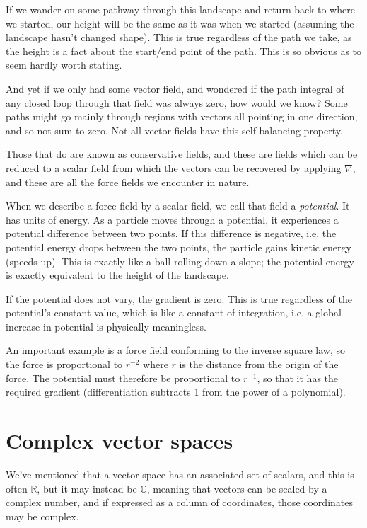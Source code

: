 If we wander on some pathway through this landscape and return back to where we started, our height will be the same as it was when we started (assuming the landscape hasn't changed shape). This is true regardless of the path we take, as the height is a fact about the start/end point of the path. This is so obvious as to seem hardly worth stating.

And yet if we only had some vector field, and wondered if the path integral of any closed loop through that field was always zero, how would we know? Some paths might go mainly through regions with vectors all pointing in one direction, and so not sum to zero. Not all vector fields have this self-balancing property.

Those that do are known as conservative fields, and these are fields which can be reduced to a scalar field from which the vectors can be recovered by applying $\nabla$, and these are all the force fields we encounter in nature.

When we describe a force field by a scalar field, we call that field a \textit{potential}. It has units of energy. As a particle moves through a potential, it experiences a potential difference between two points. If this difference is negative, i.e. the potential energy drops between the two points, the particle gains kinetic energy (speeds up). This is exactly like a ball rolling down a slope; the potential energy is exactly equivalent to the height of the landscape.

If the potential does not vary, the gradient is zero. This is true regardless of the potential's constant value, which is like a constant of integration, i.e. a global increase in potential is physically meaningless.

An important example is a force field conforming to the inverse square law, so the force is proportional to $r^{-2}$ where $r$ is the distance from the origin of the force. The potential must therefore be proportional to $r^{-1}$, so that it has the required gradient (differentiation subtracts 1 from the power of a polynomial).

\section{Complex vector spaces}\label{sec:vectors-complex}

We've mentioned that a vector space has an associated set of scalars, and this is often $\mathbb{R}$, but it may instead be $\mathbb{C}$, meaning that vectors can be scaled by a complex number, and if expressed as a column of coordinates, those coordinates may be complex.

